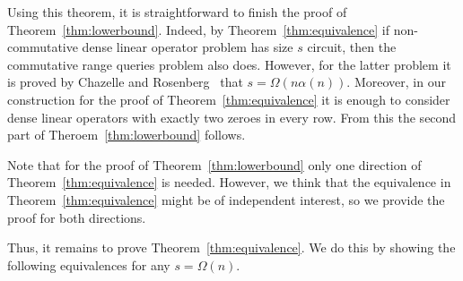 \documentclass[review,onefignum,onetabnum]{siamart190516}
\begin{document}
Using this theorem, it is straightforward to finish the proof of
Theorem~\ref{thm:lowerbound}.
Indeed, by Theorem~\ref{thm:equivalence} if non-commutative dense linear operator problem has size $s$ circuit, then the commutative range queries problem also does. However, for the latter problem it is proved by Chazelle and Rosenberg~\cite{DBLP:journals/ijcga/ChazelleR91} that $s=\Omega(n \alpha(n))$. Moreover, in our construction for the proof of Theorem~\ref{thm:equivalence} it is enough to consider dense linear operators with exactly two zeroes in every row. From this the second part of Theroem~\ref{thm:lowerbound} follows.

Note that for the proof of Theorem~\ref{thm:lowerbound} only one direction of Theorem~\ref{thm:equivalence} is needed. However, we think that the equivalence in Theorem~\ref{thm:equivalence} might be of independent interest, so we provide the proof for both directions.

Thus, it remains to prove Theorem~\ref{thm:equivalence}. We do this by showing the following equivalences for any $s = \Omega(n)$.

\begin{center}
\end{center}

\end{document}
